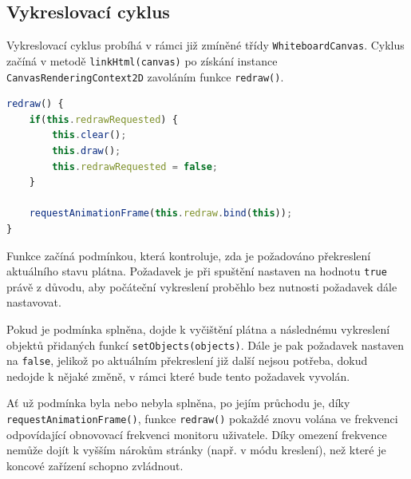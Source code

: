 \subsection{Vykreslovací cyklus}
\begin{sloppypar*}
Vykreslovací cyklus probíhá v rámci již zmíněné třídy \texttt{WhiteboardCanvas}.
Cyklus začíná v metodě \texttt{linkHtml(canvas)} po získání instance \texttt{CanvasRenderingContext2D} zavoláním funkce \texttt{redraw()}.
\end{sloppypar*}
\begin{lstlisting}[language=JavaScript,label=src:JavaScript/WhiteboardCanvas.redraw(),caption={Metoda redraw() třídy WhiteboardCanvas}]
redraw() {
	if(this.redrawRequested) {
		this.clear();
		this.draw();
		this.redrawRequested = false;
	}

	requestAnimationFrame(this.redraw.bind(this));
}
\end{lstlisting}
\begin{sloppypar*}
Funkce začíná podmínkou, která kontroluje, zda je požadováno překreslení aktuálního stavu plátna.
Požadavek je při spuštění nastaven na hodnotu \texttt{true} právě z důvodu, aby počáteční vykreslení proběhlo bez nutnosti požadavek dále nastavovat.
\end{sloppypar*}
\begin{sloppypar*}
Pokud je podmínka splněna, dojde k vyčištění plátna a následnému vykreslení objektů přidaných funkcí \texttt{setObjects(objects)}.
Dále je pak požadavek nastaven na \texttt{false}, jelikož po aktuálním překreslení již další nejsou potřeba, dokud nedojde k nějaké změně, v rámci které bude tento požadavek vyvolán.
\end{sloppypar*}
\begin{sloppypar*}
Ať už podmínka byla nebo nebyla splněna, po jejím průchodu je, díky \texttt{requestAnimationFrame()}, funkce \texttt{redraw()} pokaždé znovu volána ve frekvenci odpovídající obnovovací frekvenci monitoru uživatele.
Díky omezení frekvence nemůže dojít k vyšším nárokům stránky (např. v módu kreslení), než které je koncové zařízení schopno zvládnout.
\end{sloppypar*}


